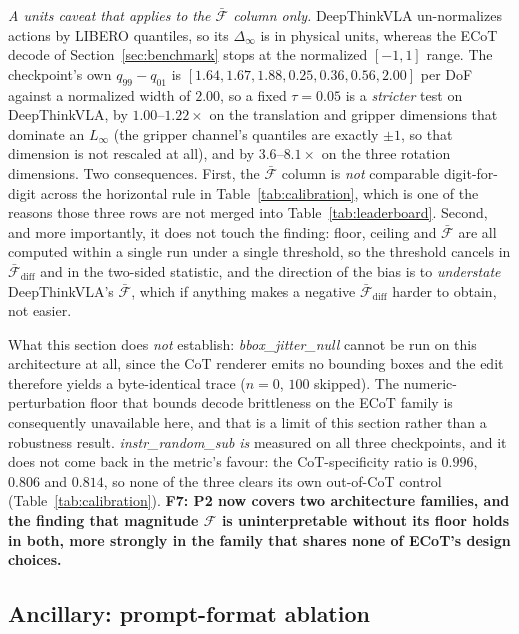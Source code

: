 \documentclass{article}
\begin{document}
\emph{A units caveat that applies to the $\bar{\mathcal{F}}$ column only.} DeepThinkVLA un-normalizes actions by LIBERO quantiles, so its $\Delta_\infty$ is in physical units, whereas the ECoT decode of Section~\ref{sec:benchmark} stops at the normalized $[-1,1]$ range. The checkpoint's own $q_{99}-q_{01}$ is $[1.64, 1.67, 1.88, 0.25, 0.36, 0.56, 2.00]$ per DoF against a normalized width of $2.00$, so a fixed $\tau = 0.05$ is a \emph{stricter} test on DeepThinkVLA, by $1.00$--$1.22\times$ on the translation and gripper dimensions that dominate an $L_\infty$ (the gripper channel's quantiles are exactly $\pm 1$, so that dimension is not rescaled at all), and by $3.6$--$8.1\times$ on the three rotation dimensions. Two consequences. First, the $\bar{\mathcal{F}}$ column is \emph{not} comparable digit-for-digit across the horizontal rule in Table~\ref{tab:calibration}, which is one of the reasons those three rows are not merged into Table~\ref{tab:leaderboard}. Second, and more importantly, it does not touch the finding: floor, ceiling and $\bar{\mathcal{F}}$ are all computed within a single run under a single threshold, so the threshold cancels in $\bar{\mathcal{F}}_{\text{diff}}$ and in the two-sided statistic, and the direction of the bias is to \emph{understate} DeepThinkVLA's $\bar{\mathcal{F}}$, which if anything makes a negative $\bar{\mathcal{F}}_{\text{diff}}$ harder to obtain, not easier.

What this section does \emph{not} establish: \emph{bbox\_jitter\_null} cannot be run on this architecture at all, since the CoT renderer emits no bounding boxes and the edit therefore yields a byte-identical trace ($n{=}0$, $100$ skipped). The numeric-perturbation floor that bounds decode brittleness on the ECoT family is consequently unavailable here, and that is a limit of this section rather than a robustness result. \emph{instr\_random\_sub} \emph{is} measured on all three checkpoints, and it does not come back in the metric's favour: the CoT-specificity ratio is $0.996$, $0.806$ and $0.814$, so none of the three clears its own out-of-CoT control (Table~\ref{tab:calibration}). \textbf{F7: P2 now covers two architecture families, and the finding that magnitude $\mathcal{F}$ is uninterpretable without its floor holds in both, more strongly in the family that shares none of ECoT's design choices.}

\subsection{Ancillary: prompt-format ablation}
\end{document}
